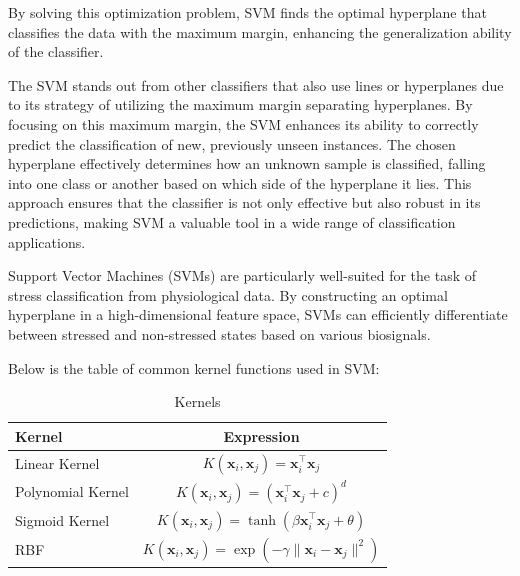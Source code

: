 By solving this optimization problem, SVM finds the optimal hyperplane that classifies the data with the maximum margin, enhancing the generalization ability of the classifier.


The SVM stands out from other classifiers that also use lines or hyperplanes due to its strategy of utilizing the maximum margin separating hyperplanes. By focusing on this maximum margin, the SVM enhances its ability to correctly predict the classification of new, previously unseen instances. The chosen hyperplane effectively determines how an unknown sample is classified, falling into one class or another based on which side of the hyperplane it lies. This approach ensures that the classifier is not only effective but also robust in its predictions, making SVM a valuable tool in a wide range of classification applications.

Support Vector Machines (SVMs) are particularly well-suited for the task of stress classification from physiological data. By constructing an optimal hyperplane in a high-dimensional feature space, SVMs can efficiently differentiate between stressed and non-stressed states based on various biosignals.

Below is the table of common kernel functions used in SVM:
\begin{table}[!ht]
    \centering
    \caption{Kernels}
    \label{tab:kernels}
    \begin{tabular}{|l|c|}
    \hline
    \textbf{Kernel}        & \textbf{Expression}                               \\ \hline
    Linear Kernel          & \( K(\mathbf{x}_i, \mathbf{x}_j) = \mathbf{x}_i^\top \mathbf{x}_j \)                \\ \hline
    Polynomial Kernel      & \( K(\mathbf{x}_i, \mathbf{x}_j) = (\mathbf{x}_i^\top \mathbf{x}_j + c)^d \)       \\ \hline
    Sigmoid Kernel         & \( K(\mathbf{x}_i, \mathbf{x}_j) = \tanh(\beta \mathbf{x}_i^\top \mathbf{x}_j + \theta) \) \\ \hline
    RBF                    & \( K(\mathbf{x}_i, \mathbf{x}_j) = \exp(-\gamma \|\mathbf{x}_i - \mathbf{x}_j \|^2) \)   \\ \hline
    \end{tabular}
    \end{table}
    
